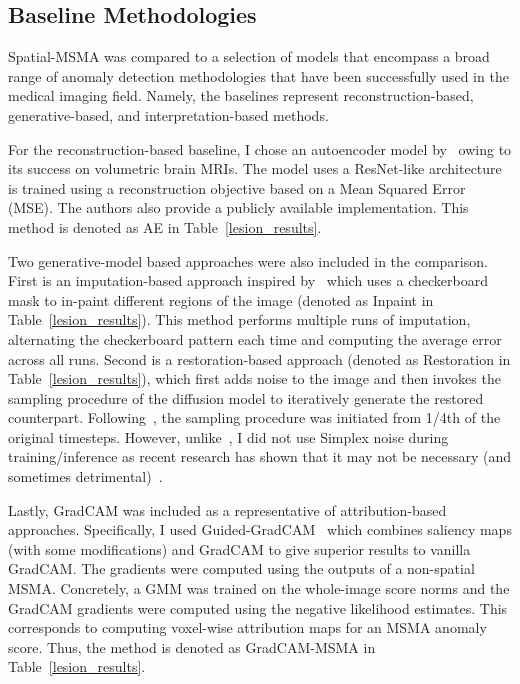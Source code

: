 \subsection*{Baseline Methodologies}

Spatial-MSMA was compared to a selection of models that encompass a broad range of anomaly detection methodologies that have been successfully used in the medical imaging field. Namely, the baselines represent reconstruction-based, generative-based, and interpretation-based methods.

For the reconstruction-based baseline, I chose an autoencoder model by~\cite{aelu2023} owing to its success on volumetric brain MRIs. The model uses a ResNet-like architecture is trained using a reconstruction objective based on a Mean Squared Error (MSE). The authors also provide a publicly available implementation. This method is denoted as AE in Table~\ref{lesion_results}.

Two generative-model based approaches were also included in the comparison. First is an imputation-based approach inspired by~\cite{liuUnsupervisedOutofDistributionDetection2023} which uses a checkerboard mask to in-paint different regions of the image (denoted as Inpaint in Table~\ref{lesion_results}). This method performs multiple runs of imputation, alternating the checkerboard pattern each time and computing the average error across all runs. Second is a restoration-based approach (denoted as Restoration in Table~\ref{lesion_results}), which first adds noise to the image and then invokes the sampling procedure of the diffusion model to iteratively generate the restored counterpart. Following~\cite{wyattAnoddpmAnomalyDetection2022}, the sampling procedure was initiated from 1/4th of the original timesteps. However, unlike~\cite{wyattAnoddpmAnomalyDetection2022}, I did not use Simplex noise during training/inference as recent research has shown that it may not be necessary (and sometimes detrimental)~\cite{kascenas2023}. 

Lastly, GradCAM was included as a representative of attribution-based approaches. Specifically, I used Guided-GradCAM~\cite{Selvaraju2016GradCAMVE} which combines saliency maps (with some modifications) and GradCAM to give superior results to vanilla GradCAM. The gradients were computed using the outputs of a non-spatial MSMA. Concretely, a GMM was trained on the whole-image score norms and the GradCAM gradients were computed using the negative likelihood estimates. This corresponds to computing voxel-wise attribution maps for an MSMA anomaly score. Thus, the method is denoted as GradCAM-MSMA in Table~\ref{lesion_results}.

